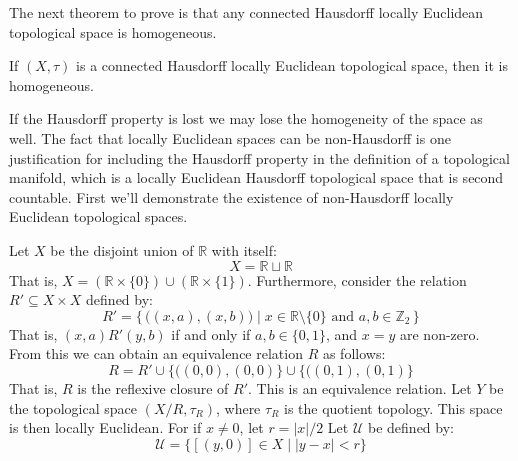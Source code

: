 \documentclass{article}                                                        %
\begin{document}
        The next theorem to prove is that any connected Hausdorff locally
        Euclidean topological space is homogeneous.
        \begin{theorem}
                If $(X,\tau)$ is a connected Hausdorff locally Euclidean
                topological space, then it is homogeneous.
        \end{theorem}
        If the Hausdorff property is lost we may lose the homogeneity of the
        space as well. The fact that locally Euclidean spaces can be
        non-Hausdorff is one justification for including the Hausdorff
        property in the definition of a topological manifold, which is a
        locally Euclidean Hausdorff topological space that is second
        countable. First we'll demonstrate the existence of non-Hausdorff
        locally Euclidean topological spaces.
        \begin{example}
                Let $X$ be the disjoint union of $\mathbb{R}$ with itself:
                \begin{equation}
                    X=\mathbb{R}\sqcup\mathbb{R}
                \end{equation}
                That is, $X=(\mathbb{R}\times\{0\})\cup(\mathbb{R}\times\{1\})$.
                Furthermore, consider the relation $R'\subseteq{X}\times{X}$
                defined by:
                \begin{equation}
                    R'=\Big\{\,\Big((x,a),(x,b)\Big)\;\Big|\;
                        x\in\mathbb{R}\setminus\{0\}
                        \textrm{ and }a,b\in\mathbb{Z}_{2}\,\Big\}
                \end{equation}
                That is, $(x,a)R'(y,b)$ if and only if $a,b\in\{0,1\}$, and
                $x=y$ are non-zero. From this we can obtain an equivalence
                relation $R$ as follows:
                \begin{equation}
                    R=R'\cup\big\{\big((0,0),(0,0)\big\}\cup
                        \big\{\big((0,1),(0,1)\big\}
                \end{equation}
                That is, $R$ is the reflexive closure of $R'$. This is an
                equivalence relation. Let $Y$ be the topological space
                $(X/R,\tau_{R})$, where $\tau_{R}$ is the quotient topology.
                This space is then locally Euclidean. For if $x\ne{0}$, let
                $r=|x|/2$ Let $\mathcal{U}$ be defined by:
                \begin{equation}
                    \mathcal{U}=\big\{[(y,0)]\in{X}\;|\;|y-x|<r\big\}

\end{equation}
\end{example}
\end{document}
